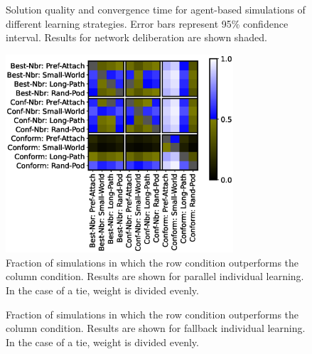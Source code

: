 \begin{figure}[]
\begin{minipage}{1.875in}
    \end{minipage}
\caption{
Solution quality and convergence time for agent-based simulations of different learning strategies. Error bars represent 95\% confidence interval. Results for network deliberation are shown shaded.
}
\end{figure}

\begin{figure}
    \label{fig:results-frac-parallel}
    \centering
    \includegraphics[width=3.33in]{chapters/figures/NetDelibABM/fig-result-frac-parallel.eps}
\caption{Fraction of simulations in which the row condition outperforms the column condition. Results are shown for parallel individual learning. In the case of a tie, weight is divided evenly.}
\end{figure}

\begin{figure}
    \label{fig:results-frac-fallback}
    \centering
\caption{Fraction of simulations in which the row condition outperforms the column condition. Results are shown for fallback individual learning. In the case of a tie, weight is divided evenly.}
\end{figure}

